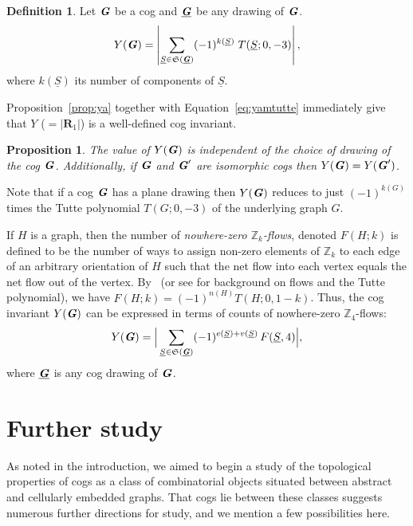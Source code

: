 \documentclass{amsart}
\newcommand{\dr}[1]{\underline{#1}}
\newcommand{\cog}[1]{\textbf{\textit #1}}
\newcommand{\spa}[1]{\mathbf{#1}}
\newtheorem{proposition}[theorem]{Proposition}
\theoremstyle{definition}
\newtheorem{definition}[theorem]{Definition}
\theoremstyle{remark}
\numberwithin{equation}{section}
\begin{document}
\begin{definition}\label{def:yamcogv2}
Let $\cog{G}$ be a cog and $\dr{\cog{G}}$ be any drawing of $\cog{G}$. 
\[ Y(\cog{G}) =  \left|\sum_{\dr{S}\in \mathfrak{S}(\dr{\cog{G}})}  (-1)^{k(\dr{S})} \; T(\dr{S}; 0, -3) \right|, \]
where
 $k(\dr{S})$ its number of components of $\dr{S}$.  
\end{definition}

Proposition~\ref{prop:ya} together with Equation~\eqref{eq:yamtutte} immediately give that $Y$ ($=|\spa{R}_{1}|$) is a well-defined cog invariant.

\begin{proposition}
The value of 
$Y(\cog{G})$ is independent of the choice of drawing of the cog $\cog{G}$. Additionally, if $\cog{G}$ and $\cog{G}'$ are isomorphic cogs then $Y(\cog{G})=Y(\cog{G}')$. 
\end{proposition}

Note that if a cog $\cog{G}$ has  a plane drawing then $Y(\cog{G})$ reduces to just $(-1)^{k(G)}$ times the Tutte polynomial $T(G;0,-3)$ of the underlying graph $G$. 


If $H$ is a graph, then the number of \emph{nowhere-zero $\mathbb{Z}_k$-flows}, denoted $F(H;k)$ is defined to be the number of ways to assign non-zero elements of $\mathbb{Z}_k$ to each edge of an arbitrary orientation of $H$ such that the net flow into each vertex equals the net flow out of the vertex. By~\cite{zbMATH03087501} (or see \cite{zbMATH07680496} for background on flows and the Tutte polynomial), we have $F(H;k) = (-1)^{n(H)}T(H;0,1-k)$. Thus, the cog invariant $Y(\cog{G})$ can be expressed in terms of counts of nowhere-zero $\mathbb{Z}_4$-flows:
\begin{equation*}\label{eq:yamtutteb}
Y(\cog{G})= \Big|\sum_{\dr{S}\in \mathfrak{S}(\dr{\cog{G}})} (-1)^{e(\dr{S})+v(\dr{S})}\, F(\dr{S},4)\Big|,
\end{equation*}
where $\dr{\cog{G}}$ is any cog drawing of $\cog{G}$.




\section{Further study}\label{sec:further}

As noted in the introduction, we aimed to begin a study of the topological properties of cogs as a class of combinatorial objects situated  between abstract and cellularly embedded graphs.  That cogs lie between these classes suggests numerous further directions for study, and we mention a few possibilities here.
\end{document}
